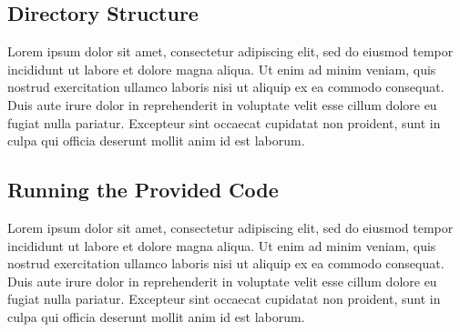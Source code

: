 \documentclass[twoside,11pt,a4paper]{article}
\begin{document}
\subsection{Directory Structure}
Lorem ipsum dolor sit amet, consectetur adipiscing elit, sed do eiusmod tempor incididunt ut labore et dolore magna aliqua. Ut enim ad minim veniam, quis nostrud exercitation ullamco laboris nisi ut aliquip ex ea commodo consequat. Duis aute irure dolor in reprehenderit in voluptate velit esse cillum dolore eu fugiat nulla pariatur. Excepteur sint occaecat cupidatat non proident, sunt in culpa qui officia deserunt mollit anim id est laborum.

\subsection{Running the Provided Code}
Lorem ipsum dolor sit amet, consectetur adipiscing elit, sed do eiusmod tempor incididunt ut labore et dolore magna aliqua. Ut enim ad minim veniam, quis nostrud exercitation ullamco laboris nisi ut aliquip ex ea commodo consequat. Duis aute irure dolor in reprehenderit in voluptate velit esse cillum dolore eu fugiat nulla pariatur. Excepteur sint occaecat cupidatat non proident, sunt in culpa qui officia deserunt mollit anim id est laborum.

\clearpage
\end{document}
